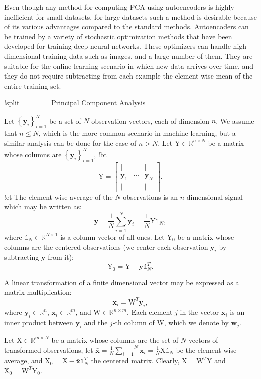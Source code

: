 Even though any method for computing PCA using autoencoders is highly
inefficient for small datasets, for large datasets such a method is
desirable because of its various advantages compared to the standard
methods. Autoencoders can be trained by a variety of stochastic
optimization methods that have been developed for training deep neural
networks. These optimizers can handle high-dimensional training data
such as images, and a large number of them. They are suitable for the
online learning scenario in which new data arrives over time, and they
do not require subtracting from each example the element-wise mean of
the entire training set. 

!split
===== Principal Component Analysis =====

Let $\left\{ \textbf{y}_i \right\}_{i=1}^N$ be a set of $N$ observation vectors, each of dimension $n$. We assume that $n \leq N$, which is the more common scenario in machine learning, but a similar analysis can be done for the case of $n > N$. Let $\text{Y} \in \mathbb{R}^{n \times N}$ be a matrix whose columns are $\left\{ \textbf{y}_i \right\}_{i=1}^N$,
!bt
\[
\text{Y} = \left[\begin{array}{ccc}
\mid &  & \mid\\
\textbf{y}_{1} & \cdots & \textbf{y}_{N}\\
\mid &  & \mid
\end{array}\right].
\]
!et
The element-wise average of the $N$ observations is an $n$ dimensional signal which may be written as:
\[
\bar{\textbf{y}} = \frac{1}{N}\overset{N}{\underset{i=1}{\sum}} \textbf{y}_i = \frac{1}{N} \text{Y} \mathbb{1}_N,
\]
where $\mathbb{1}_N \in \mathbb{R}^{N \times 1}$ is a column vector of all-ones. Let $\text{Y}_0$ be a matrix whose columns are the centered observations (we center each observation $\textbf{y}_i$ by subtracting $\bar{\textbf{y}}$ from it): 
\[
\text{Y}_0 = \text{Y} - \bar{\textbf{y}} \mathbb{1}_N^T.
\]

A linear transformation of a finite dimensional vector may be expressed as a matrix multiplication:
\[
\textbf{x}_i = \text{W}^T\textbf{y}_i,
\]
where $\textbf{y}_i \in \mathbb{R}^n$, $\textbf{x}_i \in \mathbb{R}^m$, and $\text{W} \in \mathbb{R}^{n \times m}$.
Each element $j$ in the vector $\textbf{x}_i$ is an inner product between $\textbf{y}_i$ and the $j$-th column of $\text{W}$, which we denote by $\textbf{w}_j$.

Let $\text{X} \in \mathbb{R}^{m \times N}$ be a matrix whose columns are the set of $N$ vectors of transformed observations, let $\bar{\textbf{x}} = \frac{1}{N}\overset{N}{\underset{i=1}{\sum}} \textbf{x}_i = \frac{1}{N} \text{X} \mathbb{1}_N$ be the element-wise average, and $\text{X}_0 = \text{X} - \bar{\textbf{x}} \mathbb{1}_N^T$ the centered matrix. Clearly, $\text{X} = \text{W}^T \text{Y}$ and $\text{X}_0 = \text{W}^T \text{Y}_0$. 

